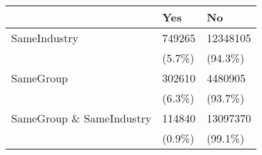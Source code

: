 \begin{tabular}{lll}
\toprule
{} &     Yes &        No \\
\midrule
SameIndustry             &  749265 &  12348105 \\
                         &  (5.7\%) &   (94.3\%) \\
SameGroup                &  302610 &   4480905 \\
                         &  (6.3\%) &   (93.7\%) \\
SameGroup \& SameIndustry &  114840 &  13097370 \\
                         &  (0.9\%) &   (99.1\%) \\
\bottomrule
\end{tabular}
